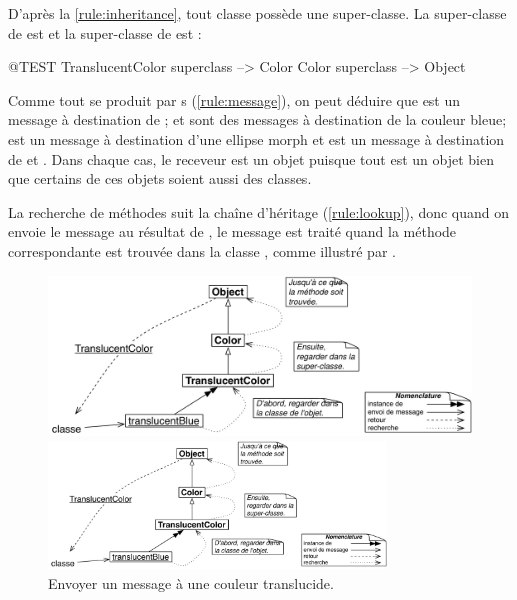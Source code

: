 \documentclass[a4paper,10pt,twoside]{book}
\begin{document}
D'apr\`es la \ref{rule:inheritance},
tout classe possède une super-classe.
La super-classe de  est  et la super-classe de  est :
\begin{code}{@TEST}
TranslucentColor superclass --> Color
Color superclass                   --> Object
\end{code}

Comme tout se produit par s (\ref{rule:message}), on peut déduire que  est un message à destination de ;  et  sont des messages à destination de la couleur bleue;  est un message à destination d'une ellipse morph et  est un message à destination de  et .
Dans chaque cas, le receveur est un objet puisque tout est un objet bien que certains de ces objets soient aussi des classes.

La recherche de méthodes suit la chaîne d'héritage (\ref{rule:lookup}), donc quand on envoie le message  au résultat de 
, le message est traité quand la méthode correspondante est trouvée dans la classe , comme illustré par .

\begin{center}
\begin{figure}[!ht]
\ifluluelse
	{\centerline{\includegraphics[width=\textwidth]{TranslucentClassMessage}}}
	{\centerline{\includegraphics[width=0.8\textwidth]{TranslucentClassMessage}}}
\caption{Envoyer un message à une couleur translucide\label{fig:classmessage}.}
\end{figure}
\end{center}
\end{document}
